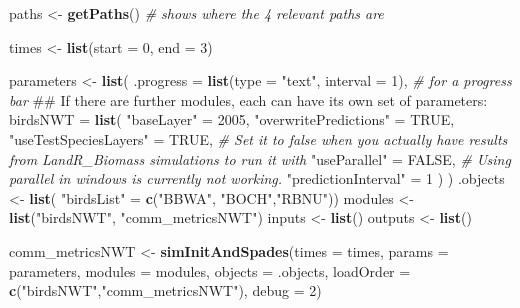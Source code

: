 \documentclass[]{article}
\newenvironment{Shaded}{\begin{snugshade}}{\end{snugshade}}
\newcommand{\KeywordTok}[1]{\textcolor[rgb]{0.13,0.29,0.53}{\textbf{#1}}}
\newcommand{\DataTypeTok}[1]{\textcolor[rgb]{0.13,0.29,0.53}{#1}}
\newcommand{\DecValTok}[1]{\textcolor[rgb]{0.00,0.00,0.81}{#1}}
\newcommand{\StringTok}[1]{\textcolor[rgb]{0.31,0.60,0.02}{#1}}
\newcommand{\CommentTok}[1]{\textcolor[rgb]{0.56,0.35,0.01}{\textit{#1}}}
\newcommand{\OtherTok}[1]{\textcolor[rgb]{0.56,0.35,0.01}{#1}}
\newcommand{\NormalTok}[1]{#1}
\begin{document}
\begin{Shaded}
\begin{Highlighting}[]
\NormalTok{paths <-}\StringTok{ }\KeywordTok{getPaths}\NormalTok{() }\CommentTok{# shows where the 4 relevant paths are}


\NormalTok{times <-}\StringTok{ }\KeywordTok{list}\NormalTok{(}\DataTypeTok{start =} \DecValTok{0}\NormalTok{, }\DataTypeTok{end =} \DecValTok{3}\NormalTok{)}

\NormalTok{parameters <-}\StringTok{ }\KeywordTok{list}\NormalTok{(}
  \DataTypeTok{.progress =} \KeywordTok{list}\NormalTok{(}\DataTypeTok{type =} \StringTok{"text"}\NormalTok{, }\DataTypeTok{interval =} \DecValTok{1}\NormalTok{), }\CommentTok{# for a progress bar}
\NormalTok{  ## If there are further modules, each can have its own set of parameters:}
\DataTypeTok{birdsNWT =} \KeywordTok{list}\NormalTok{(}
    \StringTok{"baseLayer"}\NormalTok{ =}\StringTok{ }\DecValTok{2005}\NormalTok{,}
    \StringTok{"overwritePredictions"}\NormalTok{ =}\StringTok{ }\OtherTok{TRUE}\NormalTok{,}
    \StringTok{"useTestSpeciesLayers"}\NormalTok{ =}\StringTok{ }\OtherTok{TRUE}\NormalTok{, }\CommentTok{# Set it to false when you actually have results from LandR_Biomass simulations to run it with}
    \StringTok{"useParallel"}\NormalTok{ =}\StringTok{ }\OtherTok{FALSE}\NormalTok{, }\CommentTok{# Using parallel in windows is currently not working.}
    \StringTok{"predictionInterval"}\NormalTok{ =}\StringTok{ }\DecValTok{1}
\NormalTok{  )}
\NormalTok{)}
\NormalTok{.objects <-}\StringTok{ }\KeywordTok{list}\NormalTok{(}
  \StringTok{"birdsList"}\NormalTok{ =}\StringTok{ }\KeywordTok{c}\NormalTok{(}\StringTok{"BBWA"}\NormalTok{, }\StringTok{"BOCH"}\NormalTok{,}\StringTok{"RBNU"}\NormalTok{))}
\NormalTok{modules <-}\StringTok{ }\KeywordTok{list}\NormalTok{(}\StringTok{"birdsNWT"}\NormalTok{, }\StringTok{"comm_metricsNWT"}\NormalTok{)}
\NormalTok{inputs <-}\StringTok{ }\KeywordTok{list}\NormalTok{()}
\NormalTok{outputs <-}\StringTok{ }\KeywordTok{list}\NormalTok{()}

\NormalTok{comm_metricsNWT <-}\StringTok{ }\KeywordTok{simInitAndSpades}\NormalTok{(}\DataTypeTok{times =}\NormalTok{ times, }\DataTypeTok{params =}\NormalTok{ parameters, }\DataTypeTok{modules =}\NormalTok{ modules,}
                 \DataTypeTok{objects =}\NormalTok{ .objects, }\DataTypeTok{loadOrder =} \KeywordTok{c}\NormalTok{(}\StringTok{"birdsNWT"}\NormalTok{,}\StringTok{"comm_metricsNWT"}\NormalTok{), }\DataTypeTok{debug =} \DecValTok{2}\NormalTok{)}
\end{Highlighting}
\end{Shaded}
\end{document}
